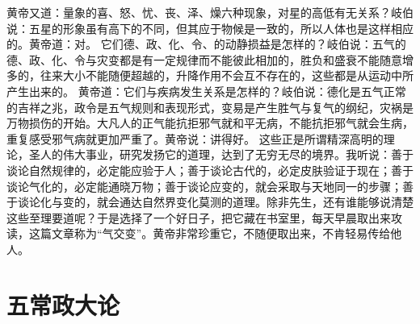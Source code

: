 \documentclass[12pt,UTF8]{ctexbook}
\begin{document}
黄帝又道：量象的喜、怒、忧、丧、泽、燥六种现象，对星的高低有无关系？岐伯说：五星的形象虽有高下的不同，但其应于物候是一致的，所以人体也是这样相应的。黄帝道：对。
它们德、政、化、令、的动静损益是怎样的？岐伯说：五气的德、政、化、令与灾变都是有一定规律而不能彼此相加的，胜负和盛衰不能随意增多的，往来大小不能随便超越的，升降作用不会互不存在的，这些都是从运动中所产生出来的。
黄帝道：它们与疾病发生关系是怎样的？岐伯说：德化是五气正常的吉祥之兆，政令是五气规则和表现形式，变易是产生胜气与复气的纲纪，灾祸是万物损伤的开始。大凡人的正气能抗拒邪气就和平无病，不能抗拒邪气就会生病，重复感受邪气病就更加严重了。黄帝说：讲得好。
这些正是所谓精深高明的理论，圣人的伟大事业，研究发扬它的道理，达到了无穷无尽的境界。我听说：善于谈论自然规律的，必定能应验于人；善于谈论古代的，必定皮肤验证于现在；善于谈论气化的，必定能通晓万物；善于谈论应变的，就会采取与天地同一的步骤；善于谈论化与变的，就会通达自然界变化莫测的道理。除非先生，还有谁能够说清楚这些至理要道呢？于是选择了一个好日子，把它藏在书室里，每天早晨取出来攻读，这篇文章称为“气交变”。黄帝非常珍重它，不随便取出来，不肯轻易传给他人。

\chapter{五常政大论}
\end{document}
